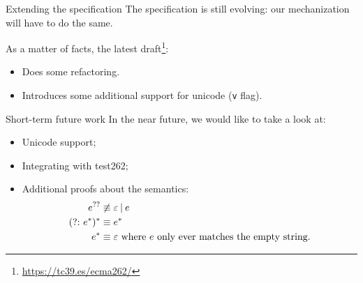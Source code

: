 \documentclass[aspectratio=169]{beamer}
\newcommand{\eps}[0]{\varepsilon}
\newcommand{\disj}[0]{\mathbin{|}}
\renewcommand{\star}[0]{^{*}}
\newcommand{\lquestion}[0]{^{??}}
\newcommand{\pgroup}[1]{({?}{:}\ #1)}
\begin{document}
    \begin{frame}{Extending the specification}
        The specification is still evolving: our mechanization will have to do the same.

        As a matter of facts, the latest draft\footnote{\url{https://tc39.es/ecma262/}}:
        \pause{}
        \begin{itemize}
            \item Does some refactoring.
            \item<4-> Introduces some additional support for unicode (\texttt{v} flag).
        \end{itemize}        
    \end{frame}

    \begin{frame}{Short-term future work}
        In the near future, we would like to take a look at:
        \pause{}
        \begin{itemize}
            \item Unicode support;
            \pause{}
            \item Integrating with test262;
            \pause{}
            \item
                Additional proofs about the semantics:
                \begin{align*}
                    e\lquestion{} \not\equiv{}& \eps{} \disj{} e \\
                    \pgroup{e\star{}}\star{} \equiv{}& e\star{}\\
                    e\star{} \equiv{}& \eps{} \textup{ where } e \textup{ only ever matches the empty string.}
                \end{align*}
        \end{itemize}
    \end{frame}
\end{document}
